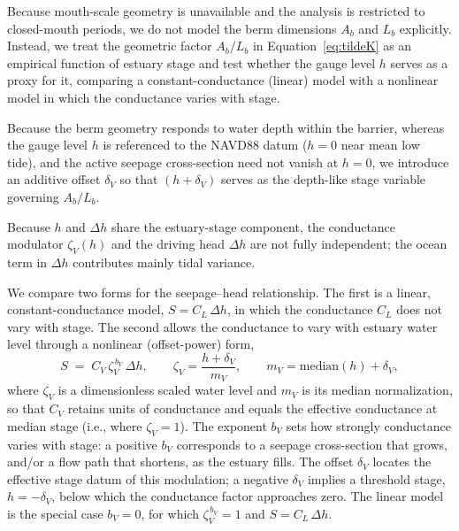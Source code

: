 \documentclass[preprint,12pt,authoryear]{elsarticle}
\begin{document}
Because mouth-scale geometry is unavailable and the analysis is restricted to closed-mouth periods, we do not model the berm dimensions $A_b$ and $L_b$ explicitly. Instead, we treat the geometric factor $A_b/L_b$ in Equation~\ref{eq:tildeK} as an empirical function of estuary stage and test whether the gauge level $h$ serves as a proxy for it, comparing a constant-conductance (linear) model with a nonlinear model in which the conductance varies with stage.

Because the berm geometry responds to water depth within the barrier, whereas the gauge level $h$ is referenced to the NAVD88 datum ($h = 0$ near mean low tide), and the active seepage cross-section need not vanish at $h = 0$, we introduce an additive offset $\delta_V$ so that $(h + \delta_V)$ serves as the depth-like stage variable governing $A_b/L_b$.

Because $h$ and $\Delta h$ share the estuary-stage component, the conductance modulator $\zeta_V(h)$ and the driving head $\Delta h$ are not fully independent; the ocean term in $\Delta h$ contributes mainly tidal variance.

We compare two forms for the seepage--head relationship. The first is a linear, constant-conductance model, $S = C_L\,\Delta h$, in which the conductance $C_L$ does not vary with stage. The second allows the conductance to vary with estuary water level through a nonlinear (offset-power) form,
\begin{equation}
  S \;=\; C_V\,\zeta_V^{\,b_V}\,\Delta h,
  \qquad
  \zeta_V = \frac{h + \delta_V}{m_V},
  \qquad
  m_V = \mathrm{median}(h) + \delta_V,
  \label{eq:offsetpower}
\end{equation}
where $\zeta_V$ is a dimensionless scaled water level and $m_V$ is its median normalization, so that $C_V$ retains units of conductance and equals the effective conductance at median stage (i.e., where $\zeta_V = 1$). The exponent $b_V$ sets how strongly conductance varies with stage: a positive $b_V$ corresponds to a seepage cross-section that grows, and/or a flow path that shortens, as the estuary fills. The offset $\delta_V$ locates the effective stage datum of this modulation; a negative $\delta_V$ implies a threshold stage, $h = -\delta_V$, below which the conductance factor approaches zero. The linear model is the special case $b_V = 0$, for which $\zeta_V^{\,b_V} = 1$ and $S = C_L\,\Delta h$.
\end{document}
